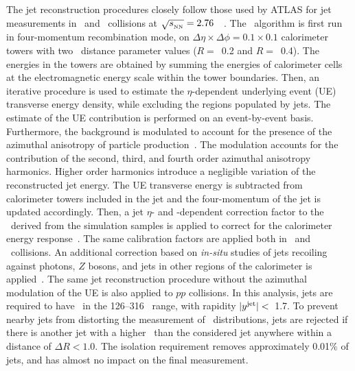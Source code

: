 
The jet reconstruction procedures closely follow those used by \mbox{ATLAS} for jet measurements in \pp\ and \PbPb\ collisions at
$\mbox{$\sqrt{s_{_\text{NN}}}$}=2.76$~\TeV~\cite{Aad:2014bxa}.
The \antikt\ algorithm is first run in four-momentum recombination mode, on
$\Delta \eta \times \Delta \phi = 0.1\times 0.1$  calorimeter towers with two \antikt\ distance parameter values ($R=$~0.2 and $R=$~0.4). The energies in the towers are obtained by summing the
	energies of calorimeter cells at the electromagnetic energy scale within the tower boundaries. Then,
	  an iterative procedure is used to estimate the $\eta$-dependent underlying event (UE)  transverse energy density, while excluding the regions populated by jets. The estimate of the UE contribution is performed on an event-by-event basis.
	Furthermore, the background is modulated to account for the presence of the azimuthal anisotropy of particle production~\cite{ATLAS:2012at}. The modulation accounts for the contribution of the second, third, and fourth order azimuthal anisotropy harmonics.
	Higher order harmonics introduce a negligible variation of the reconstructed jet energy.
	The UE transverse energy is subtracted from calorimeter towers included in the jet and the four-momentum of the jet is updated accordingly.
	  Then, a jet $\eta$- and \pT-dependent  correction factor to the \ptjet\ 
	  derived from the simulation samples is applied to correct for the calorimeter energy
	  response~\cite{Aaboud:2017jcu}. The same calibration factors are applied both 
in \pp\ and \pbpb\ collisions.
An additional correction based on \textit{in-situ} studies of jets recoiling against photons, $Z$ bosons, and jets in other regions of the calorimeter is
	  applied~\cite{ATL-PHYS-PUB-2015-036,ATLAS-CONF-2016-110}. The same jet reconstruction procedure without the
	  azimuthal modulation of the UE is also applied to $pp$ collisions.
	  In this analysis, jets are required to have \ptjet\ in the 126--316 \GeV\ range, with rapidity  $|\mbox{$y^{\mathrm{jet}}$}|<$~1.7. 
 To prevent nearby jets from distorting the measurement of \Dptr\ distributions, 
jets are rejected if there is another jet with a higher \ptjet\ than the considered jet anywhere
within a distance of $\Delta R < 1.0$. The isolation requirement removes approximately 0.01\% of jets, and has almost no impact on the final measurement.

